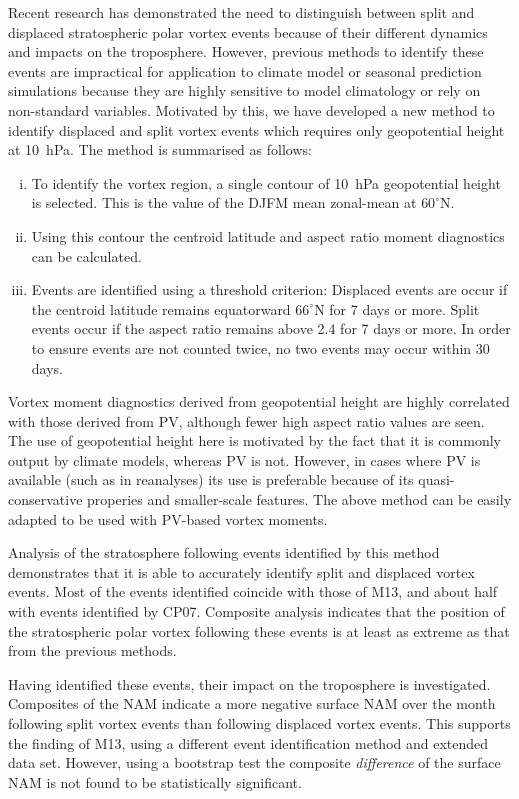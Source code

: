 Recent research has demonstrated the need to distinguish between split and
displaced stratospheric polar vortex events because of their different dynamics
and impacts on the troposphere. However, previous methods to identify these
events are impractical for application to climate model or seasonal prediction
simulations because they are highly sensitive to model climatology or rely on
non-standard variables. Motivated by this, we have developed a new method to
identify displaced and split vortex events which requires only geopotential
height at 10~hPa. The method is summarised as follows:
\begin{enumerate}[i.]
\item To identify the vortex region, a single contour of 10~hPa geopotential
  height is selected. This is the value of the DJFM mean zonal-mean at
  $60^{\circ}$N.
\item Using this contour the centroid latitude and aspect ratio moment
  diagnostics can be calculated.
\item Events are identified using a threshold criterion: Displaced events are
  occur if the centroid latitude remains equatorward $66^{\circ}$N for 7
  days or more. Split events occur if the aspect ratio remains above
  2.4 for 7 days or more. In order to ensure events are not counted twice, no
  two events may occur within 30 days.
\end{enumerate}
Vortex moment diagnostics derived from geopotential height are highly correlated
with those derived from PV, although fewer high aspect ratio values are
seen. The use of geopotential height here is motivated by the fact that it is
commonly output by climate models, whereas PV is not. However, in cases where PV
is available (such as in reanalyses) its use is preferable because of its
quasi-conservative properies and smaller-scale features. The above method can be
easily adapted to be used with PV-based vortex moments.

Analysis of the stratosphere following events identified by this method
demonstrates that it is able to accurately identify split and displaced vortex
events. Most of the events identified coincide with those of M13, and about
half with events identified by CP07. Composite analysis indicates that the
position of the stratospheric polar vortex following these events is at least as
extreme as that from the previous methods. 

Having identified these events, their impact on the troposphere is
investigated. Composites of the NAM indicate a more negative surface NAM over
the month following split vortex events than following displaced vortex
events. This supports the finding of M13, using a different event identification
method and extended data set. However, using a bootstrap test the composite
\emph{difference} of the surface NAM is not found to be statistically
significant.

